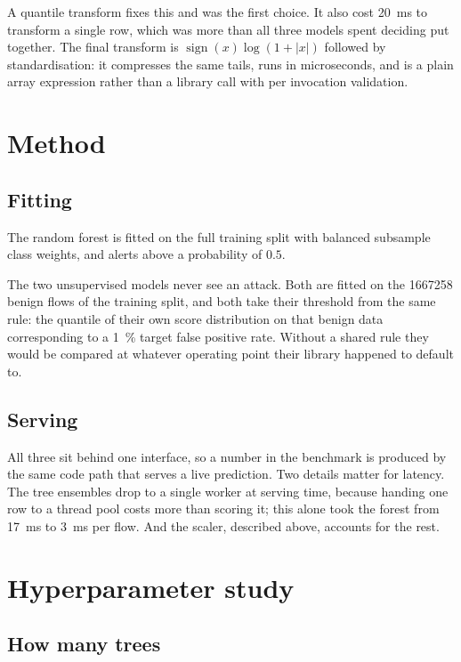 \documentclass[9pt,a4paper,twocolumn]{article}
\begin{document}
A quantile transform fixes this and was the first choice. It also cost
\SI{20}{\milli\second} to transform a single row, which was more than all three
models spent deciding put together. The final transform is
$\operatorname{sign}(x)\log(1+|x|)$ followed by standardisation: it compresses
the same tails, runs in microseconds, and is a plain array expression rather
than a library call with per invocation validation.

\section{Method}

\subsection{Fitting}

The random forest is fitted on the full training split with balanced subsample
class weights, and alerts above a probability of $0.5$.

The two unsupervised models never see an attack. Both are fitted on the
\num{1667258} benign flows of the training split, and both take their threshold
from the same rule: the quantile of their own score distribution on that benign
data corresponding to a \SI{1}{\percent} target false positive rate. Without a
shared rule they would be compared at whatever operating point their library
happened to default to.

\subsection{Serving}

All three sit behind one interface, so a number in the benchmark is produced by
the same code path that serves a live prediction. Two details matter for
latency. The tree ensembles drop to a single worker at serving time, because
handing one row to a thread pool costs more than scoring it; this alone took the
forest from \SI{17}{\milli\second} to \SI{3}{\milli\second} per flow. And the
scaler, described above, accounts for the rest.

\section{Hyperparameter study}

\subsection{How many trees}
\end{document}
